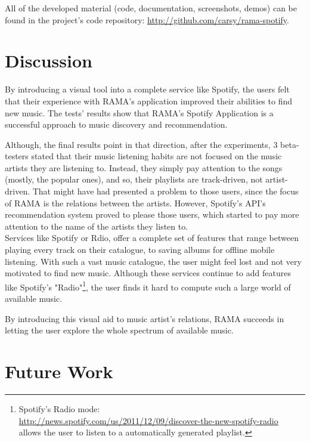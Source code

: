   All of the developed material (code, documentation, screenshots, demos) can be found in the project's code repository: \url{http://github.com/carsy/rama-spotify}.


\section{Discussion} %
\label{sec:discussion}

  By introducing a visual tool into a complete service like Spotify, the users felt that their experience with RAMA's application improved their abilities to find new music.
  The tests' results show that RAMA's Spotify Application is a successful approach to music discovery and recommendation.

  Although, the final results point in that direction, after the experiments, 3 beta-testers stated that their music listening habits are not focused on the music artists they are listening to. Instead, they simply pay attention to the songs (mostly, the popular ones), and so, their playlists are track-driven, not artist-driven.
  That might have had presented a problem to those users, since the focus of RAMA is the relations between the artists.
  However, Spotify's API's recommendation system proved to please those users, which started to pay more attention to the name of the artists they listen to. \\

  Services like Spotify or Rdio, offer a complete set of features that range between playing every track on their catalogue, to saving albums for offline mobile listening.
  With such a vast music catalogue, the user might feel lost and not very motivated to find new music.
  Although these services continue to add features like Spotify's "Radio"\footnote{Spotify's Radio mode: \\
  \url{http://news.spotify.com/us/2011/12/09/discover-the-new-spotify-radio} \\ allows the user to listen to a automatically generated playlist.}, the user finds it hard to compute such a large world of available music.

  By introducing this visual aid to music artist's relations, RAMA succeeds in letting the user explore the whole spectrum of available music.


\section{Future Work} %
\label{sec:future_work}

